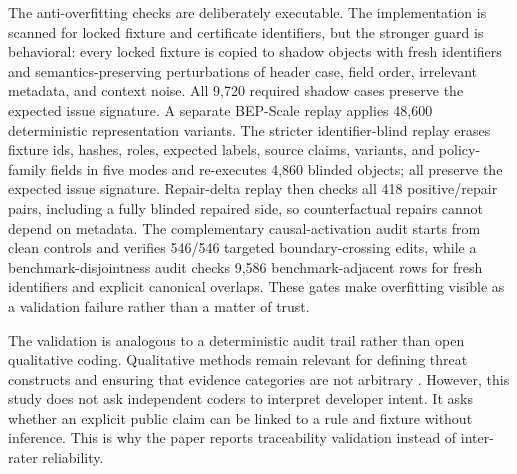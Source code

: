 \documentclass[10pt,conference]{IEEEtran}
\begin{document}
The anti-overfitting checks are deliberately executable.  The implementation is scanned for locked fixture and certificate identifiers, but the stronger guard is behavioral: every locked fixture is copied to shadow objects with fresh identifiers and semantics-preserving perturbations of header case, field order, irrelevant metadata, and context noise.  All 9,720 required shadow cases preserve the expected issue signature.  A separate BEP-Scale replay applies 48,600 deterministic representation variants.  The stricter identifier-blind replay erases fixture ids, hashes, roles, expected labels, source claims, variants, and policy-family fields in five modes and re-executes 4,860 blinded objects; all preserve the expected issue signature.  Repair-delta replay then checks all 418 positive/repair pairs, including a fully blinded repaired side, so counterfactual repairs cannot depend on metadata.  The complementary causal-activation audit starts from clean controls and verifies 546/546 targeted boundary-crossing edits, while a benchmark-disjointness audit checks 9,586 benchmark-adjacent rows for fresh identifiers and explicit canonical overlaps.  These gates make overfitting visible as a validation failure rather than a matter of trust.

The validation is analogous to a deterministic audit trail rather than open qualitative coding. Qualitative methods remain relevant for defining threat constructs and ensuring that evidence categories are not arbitrary \cite{seaman_qualitative_1999,braun_clarke_thematic_2006,runeson_case_study_2012,stol_grounded_theory_2016}. However, this study does not ask independent coders to interpret developer intent. It asks whether an explicit public claim can be linked to a rule and fixture without inference. This is why the paper reports traceability validation instead of inter-rater reliability.
\end{document}
